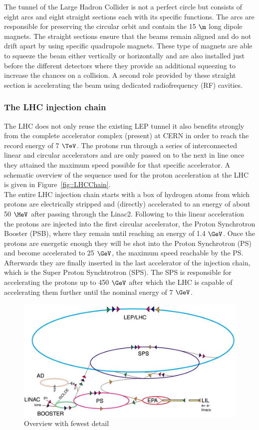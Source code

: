 The tunnel of the Large Hadron Collider is not a perfect circle but consists of eight arcs and eight straight sections each with its specific functions. 
The arcs are responsible for preserving the circular orbit and contain the 15 $\m$ long dipole magnets.
The straight sections ensure that the beams remain aligned and do not drift apart by using specific quadrupole magnets. These type of magnets are able to squeeze the beam either vertically or horizontally and are also installed just before the different detectors where they provide an additional squeezing to increase the chances on a collision. A second role provided by these straight section is accelerating the beam using dedicated radiofrequency (RF) cavities.

\subsubsection{The LHC injection chain}
The LHC does not only reuse the existing LEP tunnel it also benefits strongly from the complete accelerator complex (present) at CERN in order to reach the record energy of 7 $\TeV$. 
The protons run through a series of interconnected linear and circular accelerators and are only passed on to the next in line once they attained the maximum speed possible for that specific accelerator. A schematic overview of the sequence used for the proton acceleration at the LHC is given in Figure~\ref{fig::LHCChain}.\\
The entire LHC injection chain starts with a box of hydrogen atoms from which protons are electrically stripped and (directly) accelerated to an energy of about 50 $\MeV$ after passing through the Linac2.
Following to this linear acceleration the protons are injected into the first circular accelerator, the Proton Synchrotron Booster (PSB), where they remain until reaching an energy of 1.4 $\GeV$.
Once the protons are energetic enough they will be shot into the Proton Synchrotron (PS) and become accelerated to 25 $\GeV$, the maximum speed reachable by the PS.
Afterwards they are finally inserted in the last accelerator of the injection chain, which is the Super Proton Synchtrotron (SPS).
The SPS is responsible for accelerating the protons up to 450 $\GeV$ after which the LHC is capable of accelerating them further until the nominal energy of 7 $\GeV$.
\begin{figure}[h!t]
 \centering
 \includegraphics[width = 0.8 \textwidth]{Chapters/Chapter2_CERN/Figures/CERNAcceleratorComplex_Few.jpg}
 \caption{Overview with fewest detail}
\end{figure}

